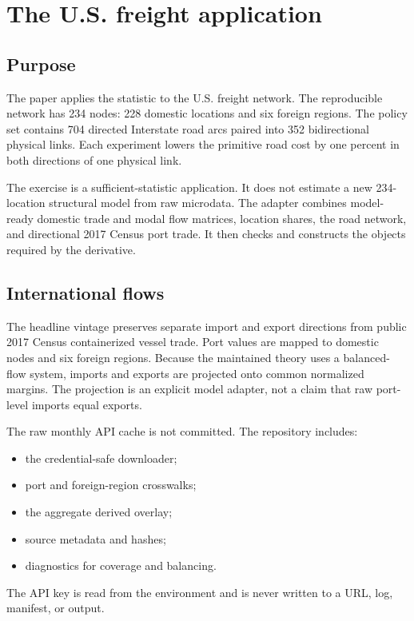 \chapter{The U.S. freight application}
\label{ch:rsue}

\section{Purpose}

The paper applies the statistic to the U.S. freight network. The reproducible
network has 234 nodes: 228 domestic locations and six foreign regions. The
policy set contains 704 directed Interstate road arcs paired into 352
bidirectional physical links. Each experiment lowers the primitive road cost
by one percent in both directions of one physical link.

The exercise is a sufficient-statistic application. It does not estimate a
new 234-location structural model from raw microdata. The adapter combines
model-ready domestic trade and modal flow matrices, location shares, the road
network, and directional 2017 Census port trade. It then checks and constructs
the objects required by the derivative.

\section{International flows}

The headline vintage preserves separate import and export directions from
public 2017 Census containerized vessel trade. Port values are mapped to
domestic nodes and six foreign regions. Because the maintained theory uses a
balanced-flow system, imports and exports are projected onto common normalized
margins. The projection is an explicit model adapter, not a claim that raw
port-level imports equal exports.

The raw monthly API cache is not committed. The repository includes:
\begin{itemize}
  \item the credential-safe downloader;
  \item port and foreign-region crosswalks;
  \item the aggregate derived overlay;
  \item source metadata and hashes;
  \item diagnostics for coverage and balancing.
\end{itemize}
The API key is read from the environment and is never written to a URL, log,
manifest, or output.

